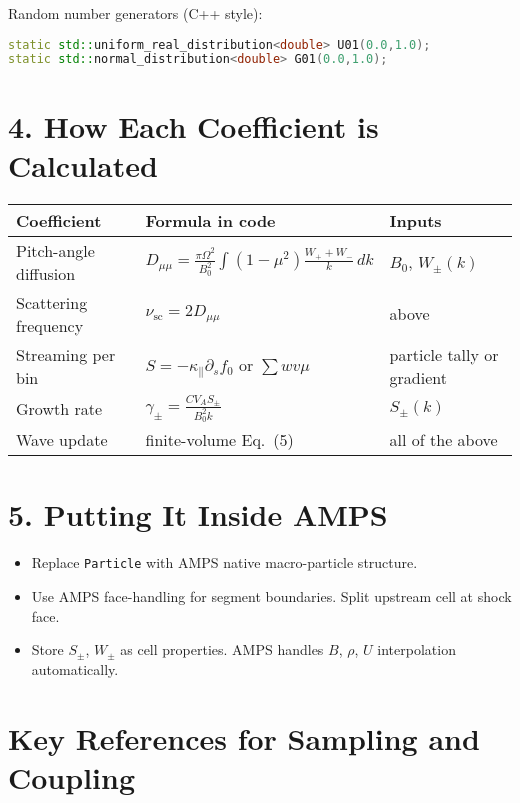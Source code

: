Random number generators (C++ style):

\begin{lstlisting}[language=C++,basicstyle=\ttfamily\footnotesize]
static std::uniform_real_distribution<double> U01(0.0,1.0);
static std::normal_distribution<double> G01(0.0,1.0);
\end{lstlisting}

\section*{4. How Each Coefficient is Calculated}

\begin{center}
\begin{tabular}{p{4.2cm} p{7.2cm} p{3.5cm}}
\toprule
\textbf{Coefficient} & \textbf{Formula in code} & \textbf{Inputs} \\
\midrule
Pitch-angle diffusion & $\displaystyle D_{\mu\mu} = \frac{\pi\Omega^{2}}{B_0^2} \int (1-\mu^2)\frac{W_+ + W_-}{k}\,dk$ & $B_0$, $W_\pm(k)$ \\
Scattering frequency & $\nu_{\text{sc}} = 2 D_{\mu\mu}$ & above \\
Streaming per bin & $S = -\kappa_\parallel \partial_s f_0$ or $\sum w v \mu$ & particle tally or gradient \\
Growth rate & $\gamma_\pm = \frac{C V_A S_\pm}{B_0^2 k}$ & $S_\pm(k)$ \\
Wave update & finite-volume Eq.~(5) & all of the above \\
\bottomrule
\end{tabular}
\end{center}

\section*{5. Putting It Inside AMPS}

\begin{itemize}
  \item Replace \texttt{Particle} with AMPS native macro-particle structure.
  \item Use AMPS face-handling for segment boundaries. Split upstream cell at shock face.
  \item Store $S_\pm$, $W_\pm$ as cell properties. AMPS handles $B$, $\rho$, $U$ interpolation automatically.
\end{itemize}

\section*{Key References for Sampling and Coupling}

